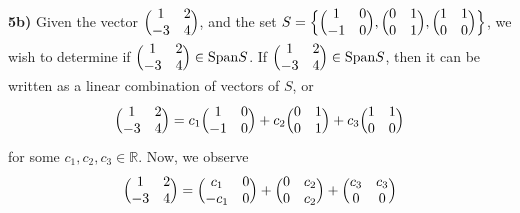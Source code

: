 \documentclass[12pt,answers]{exam}
\begin{document}
\begin{solution}
\noindent \textbf{5b)} Given the vector $\Bigl( \begin{matrix}1 & 2\\ -3 & 4\end{matrix}\Bigr)$, and the set $S=\Bigl\{ \Bigl( \begin{matrix}1 & 0\\ -1 & 0\end{matrix}\Bigr), \Bigl( \begin{matrix}0 & 1\\ 0 & 1\end{matrix}\Bigr), \Bigl( \begin{matrix}1 & 1\\ 0 & 0\end{matrix}\Bigr) \Bigr\}$, we wish to determine if $\Bigl( \begin{matrix}1 & 2\\ -3 & 4\end{matrix}\Bigr)\in \text{Span}S$. If $\Bigl( \begin{matrix}1 & 2\\ -3 & 4\end{matrix}\Bigr)\in \text{Span}S$, then it can be written as a linear combination of vectors of $S$, or
\begin{align*}
	\Bigl( \begin{matrix}1 & 2\\ -3 & 4\end{matrix}\Bigr)=c_{1}\Bigl( \begin{matrix}1 & 0\\ -1 & 0\end{matrix}\Bigr)+c_{2}\Bigl( \begin{matrix}0 & 1\\ 0 & 1\end{matrix}\Bigr)					+c_{3}\Bigl( \begin{matrix}1 & 1\\ 0 & 0\end{matrix}\Bigr)
\end{align*}
for some $c_{1},c_{2},c_{3}\in \mathbb{R}$. Now, we observe
\begin{align*}
	\Bigl( \begin{matrix}1 & 2\\ -3 & 4\end{matrix}\Bigr) &= \Bigl( \begin{matrix}c_{1} & 0\\ -c_{1} & 0\end{matrix}\Bigr)+\Bigl( \begin{matrix}0 & c_{2}\\ 0 & c_{2}\end{matrix}\Bigr)					+\Bigl( \begin{matrix}c_{3} & c_{3}\\ 0 & 0\end{matrix}\Bigr) \\

\end{align*}
\end{solution}
\end{document}
